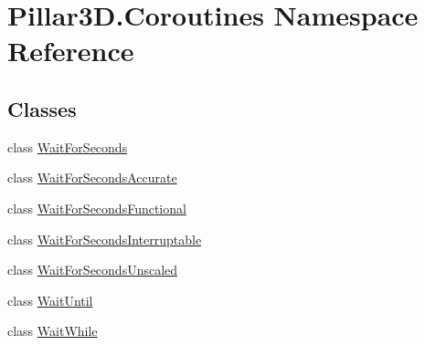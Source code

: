 \hypertarget{namespace_pillar3_d_1_1_coroutines}{}\section{Pillar3\+D.\+Coroutines Namespace Reference}
\label{namespace_pillar3_d_1_1_coroutines}
\subsection*{Classes}
\begin{DoxyCompactItemize}
\item 
class \hyperlink{class_pillar3_d_1_1_coroutines_1_1_wait_for_seconds}{Wait\+For\+Seconds}
\item 
class \hyperlink{class_pillar3_d_1_1_coroutines_1_1_wait_for_seconds_accurate}{Wait\+For\+Seconds\+Accurate}
\item 
class \hyperlink{class_pillar3_d_1_1_coroutines_1_1_wait_for_seconds_functional}{Wait\+For\+Seconds\+Functional}
\item 
class \hyperlink{class_pillar3_d_1_1_coroutines_1_1_wait_for_seconds_interruptable}{Wait\+For\+Seconds\+Interruptable}
\item 
class \hyperlink{class_pillar3_d_1_1_coroutines_1_1_wait_for_seconds_unscaled}{Wait\+For\+Seconds\+Unscaled}
\item 
class \hyperlink{class_pillar3_d_1_1_coroutines_1_1_wait_until}{Wait\+Until}
\item 
class \hyperlink{class_pillar3_d_1_1_coroutines_1_1_wait_while}{Wait\+While}
\end{DoxyCompactItemize}
